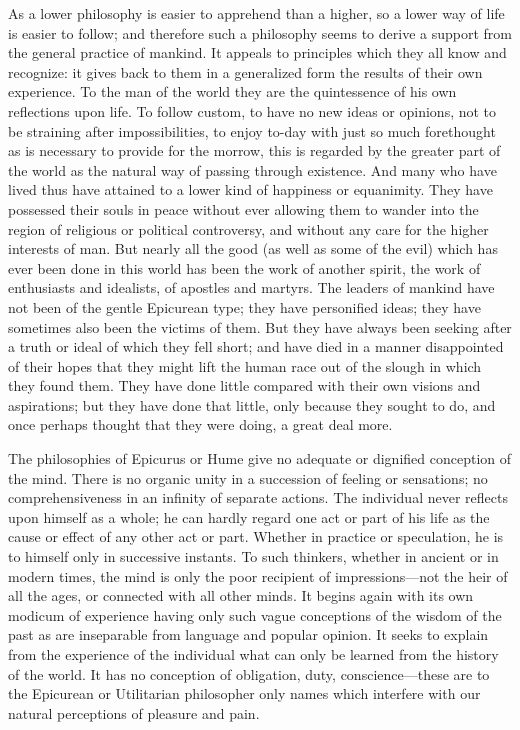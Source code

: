 \documentclass[11pt,letter]{article}
\begin{document}
\par  As a lower philosophy is easier to apprehend than a higher, so a lower way of life is easier to follow; and therefore such a philosophy seems to derive a support from the general practice of mankind. It appeals to principles which they all know and recognize: it gives back to them in a generalized form the results of their own experience. To the man of the world they are the quintessence of his own reflections upon life. To follow custom, to have no new ideas or opinions, not to be straining after impossibilities, to enjoy to-day with just so much forethought as is necessary to provide for the morrow, this is regarded by the greater part of the world as the natural way of passing through existence. And many who have lived thus have attained to a lower kind of happiness or equanimity. They have possessed their souls in peace without ever allowing them to wander into the region of religious or political controversy, and without any care for the higher interests of man. But nearly all the good (as well as some of the evil) which has ever been done in this world has been the work of another spirit, the work of enthusiasts and idealists, of apostles and martyrs. The leaders of mankind have not been of the gentle Epicurean type; they have personified ideas; they have sometimes also been the victims of them. But they have always been seeking after a truth or ideal of which they fell short; and have died in a manner disappointed of their hopes that they might lift the human race out of the slough in which they found them. They have done little compared with their own visions and aspirations; but they have done that little, only because they sought to do, and once perhaps thought that they were doing, a great deal more.

\par  The philosophies of Epicurus or Hume give no adequate or dignified conception of the mind. There is no organic unity in a succession of feeling or sensations; no comprehensiveness in an infinity of separate actions. The individual never reflects upon himself as a whole; he can hardly regard one act or part of his life as the cause or effect of any other act or part. Whether in practice or speculation, he is to himself only in successive instants. To such thinkers, whether in ancient or in modern times, the mind is only the poor recipient of impressions—not the heir of all the ages, or connected with all other minds. It begins again with its own modicum of experience having only such vague conceptions of the wisdom of the past as are inseparable from language and popular opinion. It seeks to explain from the experience of the individual what can only be learned from the history of the world. It has no conception of obligation, duty, conscience—these are to the Epicurean or Utilitarian philosopher only names which interfere with our natural perceptions of pleasure and pain.
\end{document}
